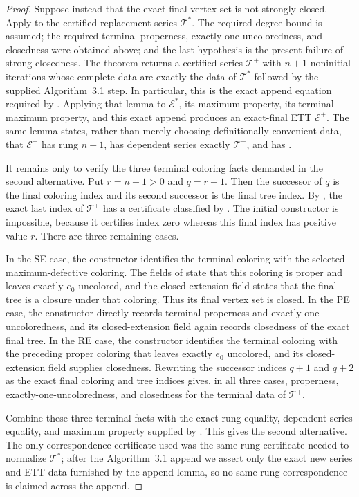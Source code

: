 \begin{proof}
Suppose instead that the exact final vertex set is not strongly closed.
Apply  to the certified replacement
series \(\mathcal T^*\).  The required degree bound is assumed; the required
terminal properness, exactly-one-uncoloredness, and closedness were obtained
above; and the last hypothesis is the present failure of strong closedness.
The theorem returns a certified series \(\mathcal T^+\) with \(n+1\)
noninitial iterations whose complete data are exactly the data of
\(\mathcal T^*\) followed by the supplied Algorithm~3.1 step.  In
particular, this is the exact append equation required by
.  Applying that lemma to
\(\mathcal E^*\), its maximum property, its terminal maximum property, and
this exact append produces an exact-final ETT \(\mathcal E^+\).  The same
lemma states, rather than merely choosing definitionally convenient data,
that \(\mathcal E^+\) has rung \(n+1\), has dependent series exactly
\(\mathcal T^+\), and has .

It remains only to verify the three terminal coloring facts demanded in the
second alternative.  Put \(r=n+1>0\) and \(q=r-1\).  Then the successor of
\(q\) is the final coloring index and its second successor is the final tree
index.  By , the exact last index of
\(\mathcal T^+\) has a certificate classified by
.  The initial constructor is impossible,
because it certifies index zero whereas this final index has positive value
\(r\).  There are three remaining cases.

In the SE case, the constructor identifies the terminal coloring with the
selected maximum-defective coloring.  The fields of
 state that this coloring is proper and
leaves exactly \(e_0\) uncolored, and the closed-extension field states that
the final tree is a closure under that coloring.  Thus its final vertex set
is closed.  In the PE case, the constructor directly records terminal
properness and exactly-one-uncoloredness, and its closed-extension field
again records closedness of the exact final tree.  In the RE case, the
constructor identifies the terminal coloring with the preceding proper
coloring that leaves exactly \(e_0\) uncolored, and its closed-extension
field supplies closedness.  Rewriting the successor indices \(q+1\) and
\(q+2\) as the exact final coloring and tree indices gives, in all three
cases, properness, exactly-one-uncoloredness, and closedness for the terminal
data of \(\mathcal T^+\).

Combine these three terminal facts with the exact rung equality, dependent
series equality, and maximum property supplied by
.  This gives the second alternative.  The
only correspondence certificate used was the same-rung certificate needed
to normalize \(\mathcal T^*\); after the Algorithm~3.1 append we assert only
the exact new series and ETT data furnished by the append lemma, so no
same-rung correspondence is claimed across the append.
\end{proof}
